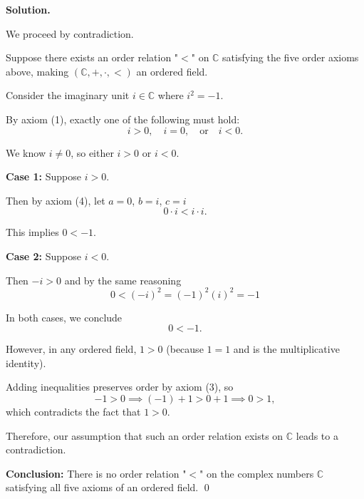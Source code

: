 \documentclass[12pt]{article}
\newenvironment{solution}{%
	\par\medskip
	\noindent\textbf{Solution.}\par\nopagebreak
}{%
	\hfill \qed \par\medskip
}
\begin{document}
	\begin{solution}
		We proceed by contradiction.
		
		Suppose there exists an order relation "$<$" on $\mathbb{C}$ satisfying the five order axioms above, making $(\mathbb{C}, +, \cdot, <)$ an ordered field.
		
		Consider the imaginary unit $i \in \mathbb{C}$ where $i^2 = -1$.
		
		By axiom (1), exactly one of the following must hold:
		\[
		i > 0, \quad i = 0, \quad \text{or} \quad i < 0.
		\]
		
		We know $i \neq 0$, so either $i > 0$ or $i < 0$.
		
		\textbf{Case 1:} Suppose $i > 0$.
		
		Then by axiom (4), let $a = 0$, $b = i$, $c = i$
		\[
		0 \cdot i < i \cdot i.
		\]
		
		This implies $0 < -1$.
		
		\textbf{Case 2:} Suppose $i < 0$.
		
		Then $-i > 0$ and by the same reasoning
		\[
		0 < (-i)^2 = (-1)^2(i)^2 = -1
		\]
		
		In both cases, we conclude
		\[
		0 < -1.
		\]
		
		However, in any ordered field, $1 > 0$ (because $1 = 1$ and is the multiplicative identity).
		
		Adding inequalities preserves order by axiom (3), so
		\[
		-1 > 0 \implies (-1) + 1 > 0 + 1 \implies 0 > 1,
		\]
		which contradicts the fact that $1 > 0$.
		
		Therefore, our assumption that such an order relation exists on $\mathbb{C}$ leads to a contradiction.
		
		\medskip
		
		\noindent\textbf{Conclusion:} There is no order relation "$<$" on the complex numbers $\mathbb{C}$ satisfying all five axioms of an ordered field.
	\end{solution}
	
\end{document}
